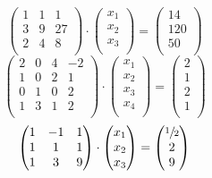 \documentclass{report}
\begin{document}
        \begin{equation}
        \begin{pmatrix}
		  1 & 1 & 1 \\
		  3 & 9 & 27 \\
		  2 & 4 & 8 \\
        \end{pmatrix}
        \cdot
        \begin{pmatrix}
          x_1 \\
          x_2 \\
          x_3 \\
        \end{pmatrix}
        =
        \begin{pmatrix}
          14 \\
          120 \\
          50 \\
        \end{pmatrix}
        \end{equation}
        \begin{equation}
        \begin{pmatrix}
		  2 & 0 & 4 & -2 \\
		  1 & 0 & 2 & 1 \\
		  0 & 1 & 0 & 2 \\
		  1 & 3 & 1 & 2 \\
        \end{pmatrix}
        \cdot
        \begin{pmatrix}
          x_1 \\
          x_2 \\
          x_3 \\ 
          x_4 \\
        \end{pmatrix}
        =
        \begin{pmatrix}
          2 \\
          1 \\
          2 \\
          1 \\
        \end{pmatrix}
        \end{equation}
        \begin{equation}
        \begin{pmatrix}
		  1 & -1 & 1 \\
		  1 & 1 & 1 \\
		  1 & 3 & 9 \\
        \end{pmatrix}
        \cdot
        \begin{pmatrix}
          x_1 \\
          x_2 \\
          x_3 \\
        \end{pmatrix}
        =
        \begin{pmatrix}
          \sfrac{1}{2}\\
          2 \\
          9 \\
        \end{pmatrix}
        \end{equation}
        
\end{document}
